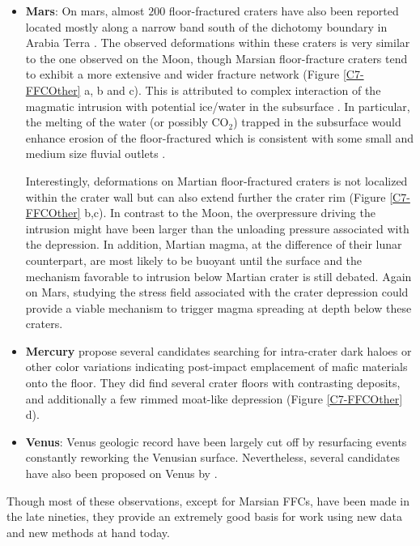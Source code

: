 \begin{itemize}
\item  \textbf{Mars}: On  mars, almost  $200$ floor-fractured  craters
  have also been reported located mostly  along a narrow band south of
  the dichotomy  boundary in Arabia Terra  \citep{Bamberg:2014hb}. The
  observed deformations  within these craters  is very similar  to the
  one observed on the Moon, though Marsian floor-fracture craters tend
  to  exhibit a  more  extensive and  wider  fracture network  (Figure
  \ref{C7-FFCOther}  a,  b  and  c). This  is  attributed  to  complex
  interaction of  the magmatic  intrusion with potential  ice/water in
  the  subsurface  \citep{Sato:2010ex,Bamberg:2014hb}. In  particular,
  the  melting  of the  water  (or  possibly  CO$_2$) trapped  in  the
  subsurface  would enhance  erosion of  the floor-fractured  which is
  consistent  with   some  small  and  medium   size  fluvial  outlets
  \citep{Sato:2010ex}.

  Interestingly,  deformations on  Martian floor-fractured  craters is
  not localized within the crater wall but can also extend further the
  crater rim (Figure \ref{C7-FFCOther} b,c).  In contrast to the Moon,
  the overpressure driving  the intrusion might have  been larger than
  the unloading pressure associated  with the depression. In addition,
  Martian magma,  at the  difference of  their lunar  counterpart, are
  most  likely to  be  buoyant  until the  surface  and the  mechanism
  favorable to intrusion below Martian  crater is still debated. Again
  on  Mars,  studying the  stress  field  associated with  the  crater
  depression  could  provide  a  viable  mechanism  to  trigger  magma
  spreading at depth below these craters.

\item   \textbf{Mercury}    \citet{Schultz:1977ec}   propose   several
  candidates  searching for  intra-crater dark  haloes or  other color
  variations  indicating post-impact  emplacement  of mafic  materials
  onto the floor. They did find several crater floors with contrasting
  deposits, and additionally a few rimmed moat-like depression (Figure
  \ref{C7-FFCOther} d).

\item \textbf{Venus}: Venus geologic record  have been largely cut off
  by  resurfacing events  constantly reworking  the Venusian  surface.
  Nevertheless, several candidates have also been proposed on Venus by
  \citet{Wichman:1995ju}.
\end{itemize}

Though most of these observations,  except for Marsian FFCs, have been
made in  the late nineties, they  provide an extremely good  basis for
work using new data and new methods at hand today.

